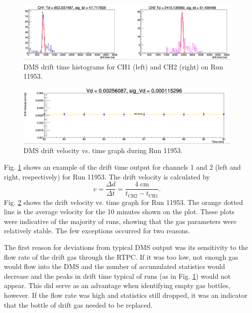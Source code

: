 \begin{figure}[h!]
	\centering
	\includegraphics[width=0.99\linewidth]{figures/DMS_11953_time.png}
	\caption{DMS drift time histograms for CH1 (left) and CH2 (right) on Run 11953.}
	\label{fig:dms_11953_time}
\end{figure}
\begin{figure}[h!]
	\centering
	\includegraphics[width=0.99\linewidth]{figures/DMS_11953_velocity.png}
	\caption{DMS drift velocity vs. time graph during Run 11953.}
	\label{fig:dms_11953_velocity}
\end{figure}

Fig. \ref{fig:dms_11953_time} shows an example of the drift time output for channels 1 and 2 (left and right, respectively) for Run 11953. The drift velocity is calculated by
\begin{equation}
v = \frac{\Delta d}{\Delta t} = \frac{4 \; \mathrm{ cm}}{t_{\mathrm{CH2}} - t_{\mathrm{CH1}}}.
\end{equation}
Fig. \ref{fig:dms_11953_velocity} shows the drift velocity vs. time graph for Run 11953. The orange dotted line is the average velocity for the 10 minutes shown on the plot. These plots were indicative of the majority of runs, showing that the gas parameters were relatively stable. The few exceptions occurred for two reasons. 

The first reason for deviations from typical DMS output was its sensitivity to the flow rate of the drift gas through the RTPC. If it was too low, not enough gas would flow into the DMS and the number of accumulated statistics would decrease and the peaks in drift time typical of runs (as in Fig. \ref{fig:dms_11953_time}) would not appear. This did serve as an advantage when identifying empty gas bottles, however. If the flow rate was high and statistics still dropped, it was an indicator that the bottle of drift gas needed to be replaced.

